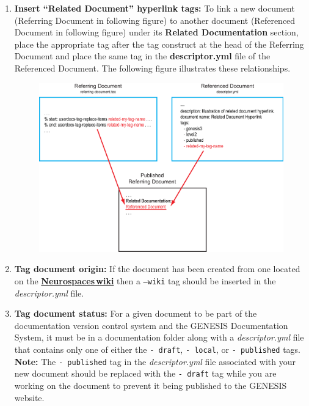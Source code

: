 \documentclass[12pt]{article}
\begin{document}
\begin{enumerate}
\begin{enumerate}
\item[]{\bf Insert ``Related Document'' hyperlink tags:} To link a new document (Referring Document in following figure) to another document (Referenced Document in following figure) under its {\bf Related Documentation} section, place the appropriate tag after the tag construct at the head of the Referring Document and place the same tag in the {\bf descriptor.yml} file of the Referenced Document. The following figure illustrates these relationships.
\begin{figure}[h]
  \centering
   \includegraphics[scale=0.8]{figures/related-document.eps}
\end{figure}

\item[]{\bf Tag document origin:} If the document has been created from one located on the \href{http://code.google.com/p/neurospaces/w/list}{\bf Neurospaces\,wiki} then a {\tt --wiki} tag should be inserted in the {\it descriptor.yml} file.

\item[]{\bf Tag document status:} For a given document to be part of the documentation version control system and the GENESIS Documentation System, it must be in a documentation folder along with a {\it descriptor.yml} file that contains only one of either the {\tt -\,draft}, {\tt -\,local}, or {\tt -\,published} tags. {\bf Note:} The {\tt-\,published} tag in the {\it descriptor.yml} file associated with your new document should be replaced with the {\tt -\,draft} tag  while you are working on the document to prevent it being published to the GENESIS website. 


\end{enumerate}
\end{enumerate}
\end{document}
